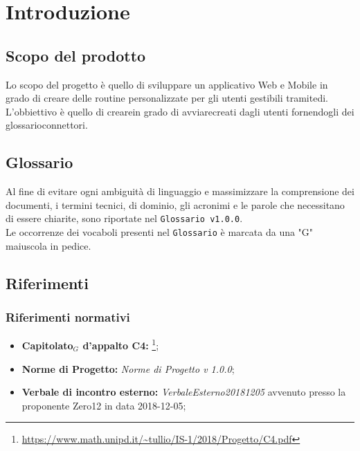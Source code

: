 \chapter{Introduzione}

\section{Scopo del prodotto}
Lo scopo del progetto è quello di sviluppare un applicativo Web e Mobile in grado di creare delle routine personalizzate per gli utenti gestibili tramitedi. L'obbiettivo è quello di crearein grado di avviarecreati dagli utenti fornendogli dei glossario{connettori}.
\section{Glossario}
Al fine di evitare ogni ambiguità di linguaggio e massimizzare la comprensione dei documenti, i termini tecnici, di dominio, gli acronimi e le parole che necessitano di essere chiarite, sono riportate nel \texttt{Glossario v1.0.0}.\\
Le occorrenze dei vocaboli presenti nel \texttt{Glossario} è marcata da una "G" maiuscola in pedice.

\section{Riferimenti}

\subsection{Riferimenti normativi}
\begin{itemize}
	
	\item \textbf{Capitolato$_{G}$ d'appalto C4:} \footnote{\url{https://www.math.unipd.it/~tullio/IS-1/2018/Progetto/C4.pdf}};
	\item \textbf{Norme di Progetto:} \textit{Norme di Progetto v 1.0.0};
	\item \textbf{Verbale di incontro esterno:} \textit{VerbaleEsterno20181205} avvenuto presso la proponente Zero12 in data 2018-12-05;

\end{itemize}

